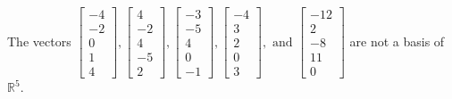 \begin{exercise}
\begin{exerciseStatement}
  \end{exerciseStatement}
  \begin{exerciseAnswer}
   The vectors \(\left[\begin{array}{r}
-4 \\
-2 \\
0 \\
1 \\
4
\end{array}\right] , \left[\begin{array}{r}
4 \\
-2 \\
4 \\
-5 \\
2
\end{array}\right] , \left[\begin{array}{r}
-3 \\
-5 \\
4 \\
0 \\
-1
\end{array}\right] , \left[\begin{array}{r}
-4 \\
3 \\
2 \\
0 \\
3
\end{array}\right] , \text{ and } \left[\begin{array}{r}
-12 \\
2 \\
-8 \\
11 \\
0
\end{array}\right]\) 
  	 are not  a basis of \(\mathbb{R}^5\).
  


  \end{exerciseAnswer}
\end{exercise}